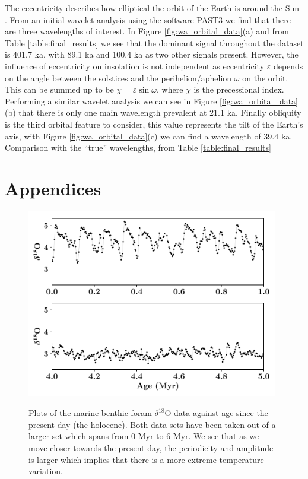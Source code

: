 \documentclass[12pt, onecolumn]{revtex4}    %
\begin{document}
The eccentricity describes how elliptical the orbit of the Earth is around the Sun \cite{carroll_astro}. From an initial wavelet analysis using the software PAST3 \cite{past3} we find that there are three wavelengths of interest. In Figure \ref{fig:wa_orbital_data}(a) and from Table \ref{table:final_results} we see that the dominant signal throughout the dataset is 401.7 ka, with 89.1 ka and 100.4 ka as two other signals present. However, the influence of eccentricity on insolation is not independent as eccentricity $\varepsilon$ depends on the angle between the solstices and the perihelion/aphelion $\omega$ on the orbit. This can be summed up to be $\chi= \varepsilon \sin{\omega}$, where $\chi$ is the precessional index. Performing a similar wavelet analysis we can see in Figure \ref{fig:wa_orbital_data}(b) that there is only one main wavelength prevalent at 21.1 ka. Finally obliquity is the third orbital feature to consider, this value represents the tilt of the Earth's axis, with Figure \ref{fig:wa_orbital_data}(c) we can find a wavelength of 39.4 ka. \\ 

Comparison with the ``true'' wavelengths, from Table \ref{table:final_results}

\newpage





\newpage

\section*{Appendices}
\begin{figure}[!h]
\begin{center}
\includegraphics[width=11cm]{figures/foram_data}
\caption[]{Plots of the marine benthic foram $\delta^{18}$O data against age since the present day (the holocene). Both data sets have been taken out of a larger set which spans from 0 Myr to 6 Myr. We see that as we move closer towards the present day, the periodicity and amplitude is larger which implies that there is a more extreme temperature variation.}
\vspace{-3ex}
\label{fig:foram_data}
\end{center}
\end{figure}
\end{document}
